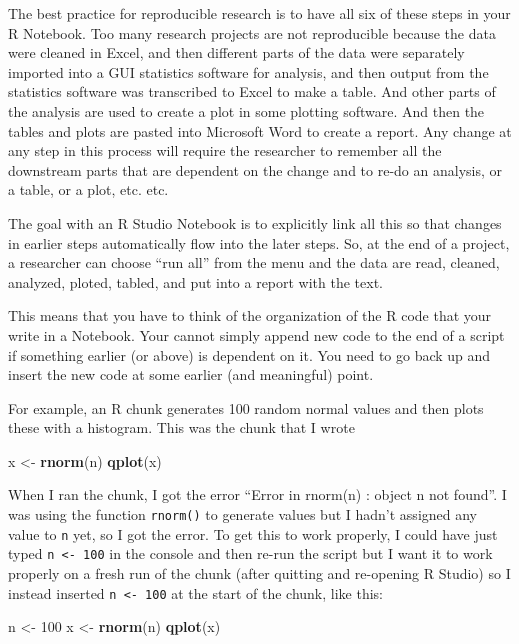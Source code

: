 \documentclass[]{book}
\newenvironment{Shaded}{\begin{snugshade}}{\end{snugshade}}
\newcommand{\KeywordTok}[1]{\textcolor[rgb]{0.13,0.29,0.53}{\textbf{#1}}}
\newcommand{\DecValTok}[1]{\textcolor[rgb]{0.00,0.00,0.81}{#1}}
\newcommand{\StringTok}[1]{\textcolor[rgb]{0.31,0.60,0.02}{#1}}
\newcommand{\NormalTok}[1]{#1}
\begin{document}
The best practice for reproducible research is to have all six of these
steps in your R Notebook. Too many research projects are not
reproducible because the data were cleaned in Excel, and then different
parts of the data were separately imported into a GUI statistics
software for analysis, and then output from the statistics software was
transcribed to Excel to make a table. And other parts of the analysis
are used to create a plot in some plotting software. And then the tables
and plots are pasted into Microsoft Word to create a report. Any change
at any step in this process will require the researcher to remember all
the downstream parts that are dependent on the change and to re-do an
analysis, or a table, or a plot, etc. etc.

The goal with an R Studio Notebook is to explicitly link all this so
that changes in earlier steps automatically flow into the later steps.
So, at the end of a project, a researcher can choose ``run all'' from
the menu and the data are read, cleaned, analyzed, ploted, tabled, and
put into a report with the text.

This means that you have to think of the organization of the R code that
your write in a Notebook. Your cannot simply append new code to the end
of a script if something earlier (or above) is dependent on it. You need
to go back up and insert the new code at some earlier (and meaningful)
point.

For example, an R chunk generates 100 random normal values and then
plots these with a histogram. This was the chunk that I wrote

\begin{Shaded}
\begin{Highlighting}[]
\NormalTok{x <-}\StringTok{ }\KeywordTok{rnorm}\NormalTok{(n)}
\KeywordTok{qplot}\NormalTok{(x)}
\end{Highlighting}
\end{Shaded}

When I ran the chunk, I got the error ``Error in rnorm(n) : object n not
found''. I was using the function \texttt{rnorm()} to generate values
but I hadn't assigned any value to \texttt{n} yet, so I got the error.
To get this to work properly, I could have just typed
\texttt{n\ \textless{}-\ 100} in the console and then re-run the script
but I want it to work properly on a fresh run of the chunk (after
quitting and re-opening R Studio) so I instead inserted
\texttt{n\ \textless{}-\ 100} at the start of the chunk, like this:

\begin{Shaded}
\begin{Highlighting}[]
\NormalTok{n <-}\StringTok{ }\DecValTok{100}
\NormalTok{x <-}\StringTok{ }\KeywordTok{rnorm}\NormalTok{(n)}
\KeywordTok{qplot}\NormalTok{(x)}
\end{Highlighting}
\end{Shaded}
\end{document}
